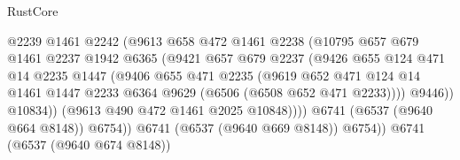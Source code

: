 \begin{lexlean}{RustCore}
\begin{coremodule}
                                      @2239
                                      @1461
                                      @2242
                                      (@9613
                                        @658
                                        @472
                                        @1461
                                        @2238
                                        (@10795
                                          @657
                                          @679
                                          @1461
                                          @2237
                                          @1942
                                          @6365
                                          (@9421
                                            @657
                                            @679
                                            @2237
                                            (@9426
                                              @655
                                              @124
                                              @471
                                              @14
                                              @2235
                                              @1447
                                              (@9406
                                                @655
                                                @471
                                                @2235
                                                (@9619
                                                  @652
                                                  @471
                                                  @124
                                                  @14
                                                  @1461
                                                  @1447
                                                  @2233
                                                  @6364
                                                  @9629
                                                  (@6506 (@6508 @652 @471 @2233))))
                                              @9446))
                                          @10834))
                                      (@9613 @490 @472 @1461 @2025 @10848))))
                                @6741
                                (@6537 (@9640 @664 @8148))
                                @6754))
                            @6741
                            (@6537 (@9640 @669 @8148))
                            @6754))
                        @6741
                        (@6537 (@9640 @674 @8148))

\end{coremodule}
\end{lexlean}
